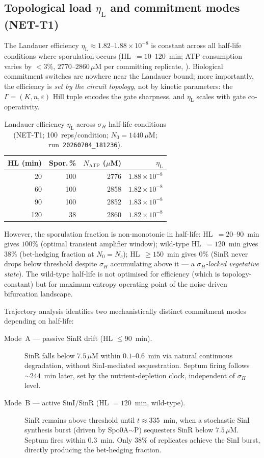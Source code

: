 \documentclass[11pt,a4paper]{article}
\newcommand{\etaL}{\eta_{\mathrm{L}}}
\begin{document}
\subsection{Topological load $\etaL$ and commitment modes (NET-T1)}
\label{sec:results_eta}

The Landauer efficiency $\etaL \approx 1.82$--$1.88 \times 10^{-8}$ is
constant across all half-life conditions where sporulation occurs
(HL~$= 10$--$120$~min; ATP consumption varies by ${<}3\%$,
$2770$--$2860\,\mu$M per committing replicate, ).
Biological commitment switches are nowhere near the Landauer bound;
more importantly, the efficiency is \emph{set by the circuit topology},
not by kinetic parameters: the $\Gamma = (K,n,\varepsilon)$ Hill tuple
encodes the gate sharpness, and $\etaL$ scales with gate co-operativity.

\begin{table}[h]
\centering
\caption{Landauer efficiency $\etaL$ across $\sigma_H$ half-life conditions
(NET-T1; 100~reps/condition; $N_0 = 1440\,\mu$M;
run~\texttt{20260704\_181236}).}
\label{tab:t1}
\begin{tabular}{rrrr}
\toprule
HL (min) & Spor.\,\% & $N_{\mathrm{ATP}}$ ($\mu$M) & $\etaL$ \\
\midrule
20  & 100 & 2776 & $1.88\times10^{-8}$ \\
60  & 100 & 2858 & $1.82\times10^{-8}$ \\
90  & 100 & 2852 & $1.83\times10^{-8}$ \\
120 &  38 & 2860 & $1.82\times10^{-8}$ \\
\bottomrule
\end{tabular}
\end{table}

However, the sporulation fraction is non-monotonic in half-life: HL~$= 20$--$90$~min
gives $100\%$ (optimal transient amplifier window); wild-type HL~$= 120$~min gives
$38\%$ (bet-hedging fraction at $N_0 = N_c$); HL~$\geq 150$~min gives $0\%$
(SinR never drops below threshold despite $\sigma_H$ accumulating above it --- a
\emph{$\sigma_H$-locked vegetative state}).
The wild-type half-life is not optimised for efficiency (which is topology-constant)
but for maximum-entropy operating point of the noise-driven bifurcation landscape.

Trajectory analysis identifies two mechanistically distinct commitment modes
depending on half-life:
\begin{description}
  \item[Mode~A --- passive SinR drift (HL $\leq 90$~min).] SinR falls below
    $7.5\,\mu$M within $0.1$--$0.6$~min via natural continuous degradation,
    without SinI-mediated sequestration.
    Septum firing follows $\sim 244$~min later, set by the nutrient-depletion
    clock, independent of $\sigma_H$ level.
  \item[Mode~B --- active SinI/SinR (HL $= 120$~min, wild-type).] SinR
    remains above threshold until $t \approx 335$~min, when a stochastic
    SinI synthesis burst (driven by Spo0A$\sim$P) sequesters SinR below
    $7.5\,\mu$M.  Septum fires within $0.3$~min.
    Only $38\%$ of replicates achieve the SinI burst, directly producing
    the bet-hedging fraction.
\end{description}
\end{document}
